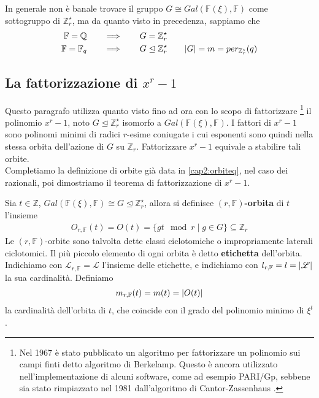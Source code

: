 In generale non è banale trovare il gruppo $G \cong Gal(\mathbb{F}(\xi), \mathbb{F})$ come sottogruppo di $\mathbb{Z}_{r}^{\star}$, ma da quanto visto in precedenza, sappiamo che
\begin{align*}
   \mathbb{F} = \mathbb{Q} \qquad &\Longrightarrow \qquad G = \mathbb{Z}_{r}^{\star} \\
   \mathbb{F} = \mathbb{F}_{q} \qquad  &\Longrightarrow \qquad G \trianglelefteq \mathbb{Z}_{r}^{\star}
      \qquad \arrowvert G \arrowvert = m = per_{\mathbb{Z}_{r}^{\star}}(q)
\end{align*}

\subsection{La fattorizzazione di $x^r - 1$} \label{cap2:fattorizzazione}
Questo paragrafo utilizza quanto visto fino ad ora con lo scopo di fattorizzare
\footnote{Nel 1967 è stato pubblicato un algoritmo per fattorizzare un polinomio sui campi finti detto algoritmo di Berkelamp\cite{berkelamp}. Questo è ancora utilizzato nell'implementazione di alcuni software, come ad esempio PARI/Gp, sebbene sia stato rimpiazzato nel 1981 dall'algoritmo di Cantor-Zassenhaus \cite{cantor}.}
il polinomio $x^r - 1$, noto $G \trianglelefteq \mathbb{Z}_{r}^{\star}$ isomorfo a $Gal(\mathbb{F}(\xi), \mathbb{F})$.
I fattori di $x^r - 1$ sono polinomi minimi di radici $r$-esime coniugate i cui esponenti sono quindi nella stessa orbita dell'azione di $G$ su $\mathbb{Z}_{r}$. Fattorizzare $x^r-1$ equivale a stabilire tali orbite.\\
Completiamo la definizione di orbite già data in \ref{cap2:orbiteq}, nel caso dei razionali, poi dimostriamo il teorema di fattorizzazione di $x^r - 1$.
\begin{definizione}
Sia $t\in \mathbb{Z}$, $Gal(\mathbb{F}(\xi), \mathbb{F}) \cong G \trianglelefteq \mathbb{Z}_{r}^{\star}$, allora si definisce {\bf $(r,\mathbb{F})$-orbita} di $t$ l'insieme
\begin{align*}
   O_{r,\mathbb{F}}(t) = O(t) = \lbrace gt \mod{r} \mid g \in G \rbrace \subseteq  \mathbb{Z}_{r}
\end{align*}
Le $(r,\mathbb{F})$-orbite sono talvolta dette classi ciclotomiche o impropriamente laterali ciclotomici. Il più piccolo elemento di ogni orbita è detto {\bf etichetta} dell'orbita. \\
Indichiamo con $\mathscr{L}_{r,\mathbb{F}} = \mathscr{L}$ l'insieme delle etichette, e indichiamo con $l_{r,\mathbb{F}} = l = \arrowvert \mathscr{L} \arrowvert$ la sua cardinalità.
Definiamo
\begin{align*}
   m_{r,\mathbb{F}}(t) = m(t) = \arrowvert O(t) \arrowvert
\end{align*}
la cardinalità dell'orbita di $t$, che coincide con il grado del polinomio minimo di $\xi^{t}$.
\end{definizione}

